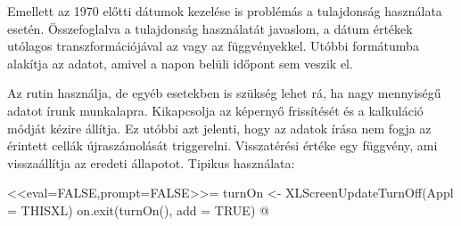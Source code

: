 \begin{description}
  Emellett az 1970 előtti dátumok kezelése is problémás a 
  tulajdonság használata esetén. Összefoglalva a 
  tulajdonság használatát javaslom, a dátum értékek utólagos
  transzformációjával az  vagy az 
  függvényekkel. Utóbbi  formátumba alakítja az adatot, amivel
  a napon belüli időpont sem veszik el.  
\item[\code{XLScreenUpdateTurnOff}] Az
   rutin használja, de egyéb esetekben is szükség lehet rá,
  ha nagy mennyiségű adatot írunk  munkalapra. Kikapcsolja az
   képernyő frissítését és a kalkuláció módját kézire
  állítja. Ez utóbbi azt jelenti, hogy az adatok írása nem fogja az
  érintett cellák újraszámolását triggerelni. Visszatérési értéke egy
  függvény, ami visszaállítja az eredeti állapotot. Tipikus
  használata:
  \begin{Rnw}
<<eval=FALSE,prompt=FALSE>>=
turnOn <- XLScreenUpdateTurnOff(Appl = THISXL)
on.exit(turnOn(), add = TRUE)
@ 
\end{Rnw} 


\end{description}
